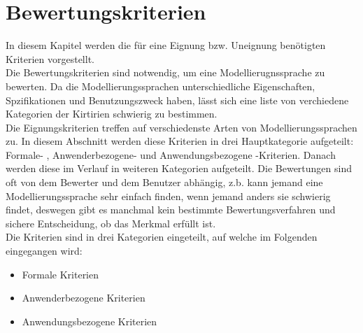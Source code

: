 

\chapter{Bewertungskriterien}
\label{ch:Bewertungskriterien}
In diesem Kapitel werden die für eine Eignung bzw. Uneignung benötigten Kriterien vorgestellt.\\
Die Bewertungskriterien sind notwendig, um eine Modellierugnssprache zu bewerten. Da die Modellierungssprachen unterschiedliche Eigenschaften, Spzifikationen und Benutzungszweck haben, lässt sich eine liste von verchiedene Kategorien der Kirtirien  schwierig zu bestimmen.\\
Die Eignungskriterien treffen auf verschiedenste Arten von Modellierungssprachen zu. In diesem Abschnitt werden diese Kriterien in drei Hauptkategorie aufgeteilt: Formale- , Anwenderbezogene- und Anwendungsbezogene -Kriterien. Danach werden diese im Verlauf in weiteren Kategorien aufgeteilt.
Die Bewertungen sind oft von dem Bewerter und dem Benutzer abhängig, z.b. kann jemand eine Modellierungssprache sehr einfach finden, wenn jemand anders sie schwierig findet, deswegen gibt es manchmal kein bestimmte Bewertungsverfahren und sichere Entscheidung, ob das Merkmal erfüllt ist.\\

Die Kriterien sind in drei Kategorien eingeteilt, auf welche im Folgenden eingegangen wird:

\begin{itemize}
	\item Formale Kriterien
	\item Anwenderbezogene Kriterien
	\item Anwendungsbezogene Kriterien
\end{itemize}






